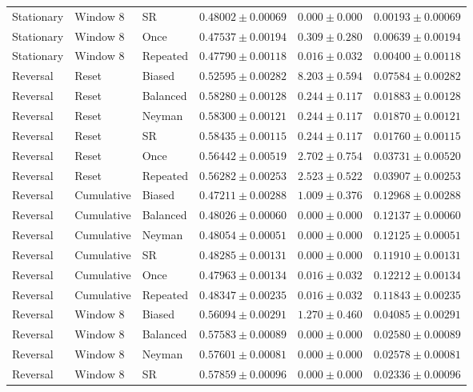 \begin{longtable}{@{}llllll@{}}
Stationary & Window 8 & SR & $0.48002 \pm 0.00069$ & $0.000 \pm 0.000$ & $0.00193 \pm 0.00069$ \\
Stationary & Window 8 & Once & $0.47537 \pm 0.00194$ & $0.309 \pm 0.280$ & $0.00639 \pm 0.00194$ \\
Stationary & Window 8 & Repeated & $0.47790 \pm 0.00118$ & $0.016 \pm 0.032$ & $0.00400 \pm 0.00118$ \\
Reversal & Reset & Biased & $0.52595 \pm 0.00282$ & $8.203 \pm 0.594$ & $0.07584 \pm 0.00282$ \\
Reversal & Reset & Balanced & $0.58280 \pm 0.00128$ & $0.244 \pm 0.117$ & $0.01883 \pm 0.00128$ \\
Reversal & Reset & Neyman & $0.58300 \pm 0.00121$ & $0.244 \pm 0.117$ & $0.01870 \pm 0.00121$ \\
Reversal & Reset & SR & $0.58435 \pm 0.00115$ & $0.244 \pm 0.117$ & $0.01760 \pm 0.00115$ \\
Reversal & Reset & Once & $0.56442 \pm 0.00519$ & $2.702 \pm 0.754$ & $0.03731 \pm 0.00520$ \\
Reversal & Reset & Repeated & $0.56282 \pm 0.00253$ & $2.523 \pm 0.522$ & $0.03907 \pm 0.00253$ \\
Reversal & Cumulative & Biased & $0.47211 \pm 0.00288$ & $1.009 \pm 0.376$ & $0.12968 \pm 0.00288$ \\
Reversal & Cumulative & Balanced & $0.48026 \pm 0.00060$ & $0.000 \pm 0.000$ & $0.12137 \pm 0.00060$ \\
Reversal & Cumulative & Neyman & $0.48054 \pm 0.00051$ & $0.000 \pm 0.000$ & $0.12125 \pm 0.00051$ \\
Reversal & Cumulative & SR & $0.48285 \pm 0.00131$ & $0.000 \pm 0.000$ & $0.11910 \pm 0.00131$ \\
Reversal & Cumulative & Once & $0.47963 \pm 0.00134$ & $0.016 \pm 0.032$ & $0.12212 \pm 0.00134$ \\
Reversal & Cumulative & Repeated & $0.48347 \pm 0.00235$ & $0.016 \pm 0.032$ & $0.11843 \pm 0.00235$ \\
Reversal & Window 8 & Biased & $0.56094 \pm 0.00291$ & $1.270 \pm 0.460$ & $0.04085 \pm 0.00291$ \\
Reversal & Window 8 & Balanced & $0.57583 \pm 0.00089$ & $0.000 \pm 0.000$ & $0.02580 \pm 0.00089$ \\
Reversal & Window 8 & Neyman & $0.57601 \pm 0.00081$ & $0.000 \pm 0.000$ & $0.02578 \pm 0.00081$ \\
Reversal & Window 8 & SR & $0.57859 \pm 0.00096$ & $0.000 \pm 0.000$ & $0.02336 \pm 0.00096$ \\

\end{longtable}
